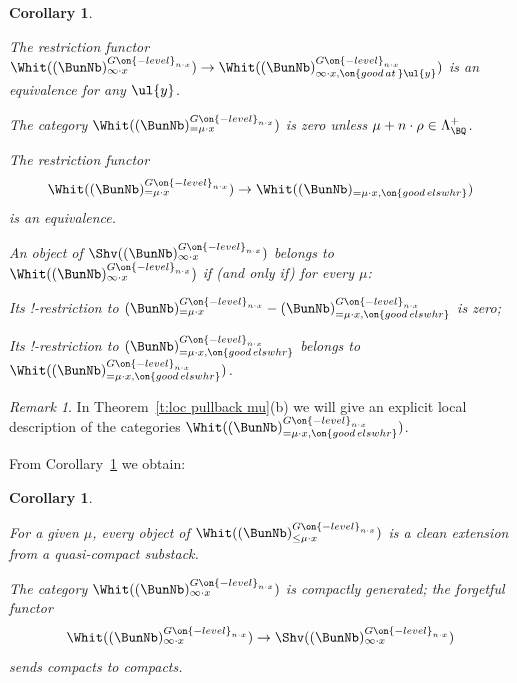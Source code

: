 \documentclass[9pt]{amsart}
\newtheorem{cor}[subsubsection]{Corollary}
\theoremstyle{definition}
\theoremstyle{remark}
\newtheorem{rem}[subsubsection]{Remark}
\newcommand{\thmref}[1]{Theorem~\ref{#1}}
\newcommand{\corref}[1]{Corollary~\ref{#1}}
\numberwithin{equation}{section}
\begin{document}
\begin{cor} \label{c:good strata} \hfill

\smallskip

 The restriction functor
$\Whit((\BunNb)^{G\on{-level}_{n\cdot x}}_{\infty\cdot x})\to \Whit((\BunNb)^{G\on{-level}_{n\cdot x}}_{\infty\cdot x,\on{good\,at\,}\ul{y}})$
is an equivalence for any $\ul{y}$.

\smallskip

The category $\Whit((\BunNb)^{G\on{-level}_{n\cdot x}}_{=\mu\cdot x})$ is zero
unless $\mu+n\cdot \rho\in \Lambda^+_\BQ$.

\smallskip

 The restriction functor
$$\Whit((\BunNb)^{G\on{-level}_{n\cdot x}}_{=\mu\cdot x})\to \Whit((\BunNb)_{=\mu\cdot x,\on{good\,elswhr}})$$
is an equivalence. 

\smallskip

 An object of $\Shv((\BunNb)_{\infty\cdot x}^{G\on{-level}_{n\cdot x}})$ belongs to
$\Whit((\BunNb)_{\infty\cdot x}^{G\on{-level}_{n\cdot x}})$ if (and only if) for every $\mu$:

\smallskip

 Its !-restriction to 
$(\BunNb)^{G\on{-level}_{n\cdot x}}_{=\mu\cdot x}-
(\BunNb)^{G\on{-level}_{n\cdot x}}_{=\mu\cdot x,\on{good\,elswhr}}$
is zero;

\smallskip

 Its !-restriction to $(\BunNb)^{G\on{-level}_{n\cdot x}}_{=\mu\cdot x,\on{good\,elswhr}}$
belongs to $\Whit((\BunNb)^{G\on{-level}_{n\cdot x}}_{=\mu\cdot x,\on{good\,elswhr}})$. 

\end{cor}

\begin{rem}
In \thmref{t:loc pullback mu}(b) we will give an explicit local description of the categories 
$\Whit((\BunNb)^{G\on{-level}_{n\cdot x}}_{=\mu\cdot x,\on{good\,elswhr}})$.
\end{rem}

\sssec{}

From \corref{c:good strata} we obtain:

\begin{cor}  \hfill  \label{c:glob Whit comp gen}

\smallskip

 For a given $\mu$, 
every object of $\Whit((\BunNb)^{G\on{-level}_{n\cdot x}}_{\leq \mu\cdot x})$ 
is a clean extension from a quasi-compact substack.

\smallskip

 The category $\Whit((\BunNb)^{G\on{-level}_{n\cdot x}}_{\infty\cdot x})$ 
is compactly generated; the forgetful functor
$$\Whit((\BunNb)^{G\on{-level}_{n\cdot x}}_{\infty\cdot x})\to 
\Shv((\BunNb)^{G\on{-level}_{n\cdot x}}_{\infty\cdot x})$$ sends compacts to compacts.

\end{cor}
\end{document}
